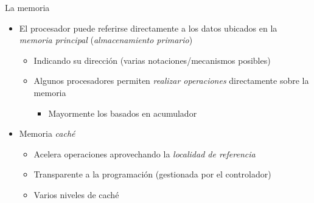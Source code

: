 \documentclass[presentation]{beamer}
\begin{document}
\begin{frame}[label={sec:orgec6457c}]{La memoria}
\begin{itemize}
\item El procesador puede referirse directamente a los datos ubicados en
la \emph{memoria principal} (\emph{almacenamiento primario})
\begin{itemize}
\item Indicando su dirección (varias notaciones/mecanismos posibles)
\item Algunos procesadores permiten \emph{realizar operaciones} directamente
sobre la memoria
\begin{itemize}
\item Mayormente los basados en acumulador
\end{itemize}
\end{itemize}
\item Memoria \emph{caché}
\begin{itemize}
\item Acelera operaciones aprovechando la \emph{localidad de referencia}
\item Transparente a la programación (gestionada por el controlador)
\item Varios niveles de caché
\end{itemize}
\end{itemize}
\end{frame}
\end{document}
